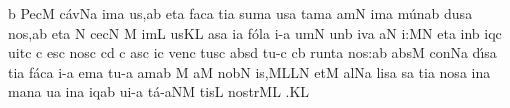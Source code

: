 \initiumgregorianum
\znotes\fissum{1pt}\bmolle b\en
%
\sgn Pec\punctum M\egn
\sgn c{\'a}{v}\pes Na\egn
\sgn {}i{m}\punctum a\egn
\sgn {}u{s,}\punctum a\augmentum b\egn
\spatium
\begingroup
\bgenerale
\sgn {}et\punctum a\egn
\spatium
\sgn fac\punctum a\egn
\sgn ti{}\punctum a\egn
\spatium
\sgn s{u}m\punctum a\egn
\sgn {}us\punctum a\egn
\spatium
\sgn tam\punctum a\egn
{}am\punctum N\egn
\spatium
\sgn {}im\punctum a\egn
\sgn m{\'u}n\pes ab\egn
\sgn dus\punctum a\egn
\spatium
\sgn no{s,}\punctum a\augmentum b\egn
\spatium
\divisiominima
\spatium
\sgn {}et\punctum a\egn
\spatium
\custos N
\lineaproxima
\sgn ce{c}\punctum N\egn
{}\punctum M\egn
\sgn {}i{m}\punctum L\egn
\sgn {}us\punctum K\augmentum L\egn
\spatium
\divisiominor
\spatium
as\punctum a\egn
\sgn {}i{}\punctum a\egn
\spatium
\sgn f{\'o}{l}\punctum a\egn
\sgn {}i{-}\punctum a\egn
\sgn {}um\punctum N\egn
\spatium
\sgn {}u{n}\punctum b\egn
\sgn {}i{v}\punctum a\egn
{}\clivis aN\egn
\sgn {}i:\punctum M\augmentum N\egn
\spatium
\divisiomaior
\spatium
\sgn {}et\punctum a\egn
\spatium
\sgn {}in\punctum b\egn
\sgn {}iq\punctum c\egn
\sgn ui{t}\punctum c\egn
{}\punctum c\egn
\sgn {}es\punctum c\egn
\spatium
\sgn n{o}s\punctum c\egn
{}\punctum c\augmentum d\egn
\spatium
\custos c
\lineaproxima
{}a{s}\punctum c\egn
\sgn {}i{}\punctum c\egn
\spatium
\sgn v{e}n\punctum c\egn
\sgn tus\punctum c\egn
\spatium
\sgn {}a{bs}\punctum d\egn
\sgn tu{-}\punctum c\egn
{}\clivis cb\egn
\sgn ru{nt}\punctum a\egn
\spatium
\sgn no{s:}\punctum a\augmentum b\egn
\spatium
\divisiominor
\spatium
\sgn {}a{bs}\punctum M\egn
\sgn c{o}{n}\pes Na\egn
\sgn d{\'\i}s\punctum a\egn
\sgn ti{}\punctum a\egn
\spatium
\sgn f{\'a}{c}\punctum a\egn
\sgn {}i{-}\punctum a\egn
\sgn {}em\punctum a\egn
\spatium
\sgn t{u}{-}\punctum a\egn
\sgn {}am\punctum a\augmentum b\egn
\spatium
\custos M
\lineaproxima
\sgn {}a{}\punctum M\egn
\spatium
\sgn n{o}{b}\punctum N\egn
\sgn {}i{s,}\clivis ML\augmentumduplex LN\egn
\spatium
\divisiomaior
\spatium
\sgn {}et\punctum M\egn
\spatium
\sgn {}al\pes Na\egn
\sgn li{s}\punctum a\egn
\sgn {}{\'\i}s\punctum a\egn
\sgn ti{}\punctum a\egn
\spatium
\sgn nos\punctum a\egn
\spatium
\sgn {}in\punctum a\egn
\spatium
\sgn m{a}{n}\punctum a\egn
\sgn {}u{}\punctum a\egn
\spatium
\sgn {}i{n}\punctum a\egn
\sgn {}iq\pes ab\egn
\sgn ui{-}\punctum a\egn
\sgn t{\'a}{-}\climacus aNM\egn
\sgn tis\punctum L\egn
\spatium
\sgn n{o}{str}\clivis ML\egn
\sgn {}{\ae}.\punctum K\augmentum L\egn
\endgroup
\Finisgregoriana


